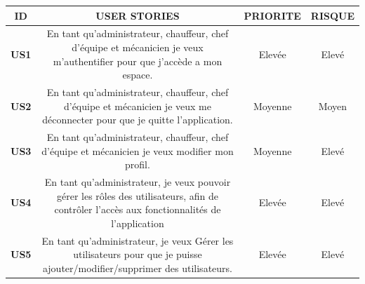

\begin{table}[htbp]
  \centering
  \renewcommand{\arraystretch}{4.15} %
  \begin{tabular}{|c|c|c|c|}
    \hline
    \textbf{ID}   & \textbf{USER STORIES}                                                                                                                                                & \textbf{PRIORITE} & \textbf{RISQUE} \\


    \hline
    \textbf{US1}  & \parbox{9cm}{\centering En tant qu’administrateur, chauffeur, chef d'équipe et mécanicien je veux m'authentifier pour que j'accède a mon espace.}                    & Elevée            & Elevé           \\
    \hline
    \textbf{US2}  & \parbox{9cm}{\centering En tant qu’administrateur, chauffeur, chef d'équipe et mécanicien je veux me déconnecter pour que je quitte l'application.}                  & Moyenne           & Moyen           \\
    \hline
    \textbf{US3}  & \parbox{9cm}{\centering En tant qu’administrateur, chauffeur, chef d'équipe et mécanicien je veux modifier mon profil.}                                              & Moyenne           & Elevé           \\
    \hline
    \textbf{US4}  & \parbox{9cm}{\centering En tant qu'administrateur, je veux pouvoir gérer les rôles des utilisateurs, afin de contrôler l'accès aux fonctionnalités de l'application} & Elevée            & Elevé           \\
    \hline
    \textbf{US5}  & \parbox{9cm}{\centering En tant qu’administrateur, je veux Gérer les utilisateurs pour que je puisse ajouter/modifier/supprimer des utilisateurs. }                  & Elevée            & Elevé           \\
    \hline


\end{tabular}
\end{table}
